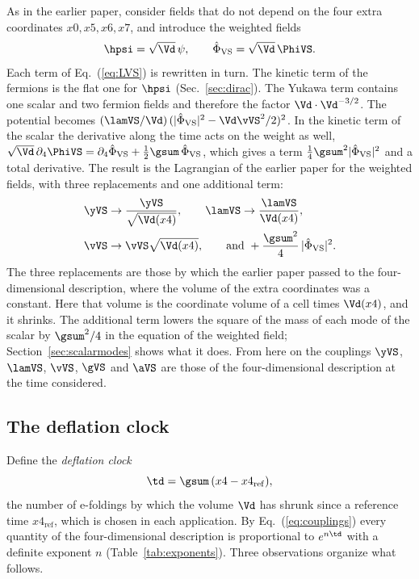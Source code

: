 As in the earlier paper, consider fields that do not depend on the four extra coordinates
$x0,x5,x6,x7$, and introduce the weighted fields
\begin{equation}
\hpsi=\sqrt{\Vd}\,\psi,\qquad\hat\Phi_{\mathrm{VS}}=\sqrt{\Vd}\,\PhiVS .
\end{equation}
Each term of Eq.~(\ref{eq:LVS}) is rewritten in turn. The kinetic term of the fermions is the flat
one for $\hpsi$ (Sec.~\ref{sec:dirac}). The Yukawa term contains one scalar and two fermion fields
and therefore the factor $\Vd\cdot\Vd^{-3/2}$. The potential becomes
$(\lamVS/\Vd)\,(|\hat\Phi_{\mathrm{VS}}|^{2}-\Vd\vVS^{2}/2)^{2}$. In the kinetic term of the scalar the
derivative along the time acts on the weight as well,
$\sqrt{\Vd}\,\partial_4\PhiVS=\partial_4\hat\Phi_{\mathrm{VS}}+\tfrac12\gsum\,\hat\Phi_{\mathrm{VS}}$,
which gives a term $\tfrac14\gsum^{2}|\hat\Phi_{\mathrm{VS}}|^{2}$ and a total derivative. The result
is the Lagrangian of the earlier paper for the weighted fields, with three replacements and one
additional term:
\begin{equation}
\begin{aligned}
&\yVS\to\frac{\yVS}{\sqrt{\Vd(x4)}},\qquad\lamVS\to\frac{\lamVS}{\Vd(x4)},\\
&\vVS\to\vVS\sqrt{\Vd(x4)},\qquad\text{and }+\frac{\gsum^{2}}{4}\,|\hat\Phi_{\mathrm{VS}}|^{2}.
\end{aligned}
\label{eq:couplings}
\end{equation}
The three replacements are those by which the earlier paper passed to the four-dimensional
description, where the volume of the extra coordinates was a constant. Here that volume is the
coordinate volume of a cell times $\Vd(x4)$, and it shrinks. The additional term lowers the square of
the mass of each mode of the scalar by $\gsum^{2}/4$ in the equation of the weighted field;
Section~\ref{sec:scalarmodes} shows what it does. From here on the couplings $\yVS$, $\lamVS$,
$\vVS$, $\gVS$ and $\aVS$ are those of the four-dimensional description at the time considered.

\subsection{The deflation clock}

Define the \emph{deflation clock}
\begin{equation}
\td=\gsum\,(x4-x4_{\mathrm{ref}}),
\label{eq:clock}
\end{equation}
the number of e-foldings by which the volume $\Vd$ has shrunk since a reference time
$x4_{\mathrm{ref}}$, which is chosen in each application. By Eq.~(\ref{eq:couplings}) every quantity
of the four-dimensional description is proportional to $e^{n\td}$ with a definite exponent $n$
(Table~\ref{tab:exponents}). Three observations organize what follows.

